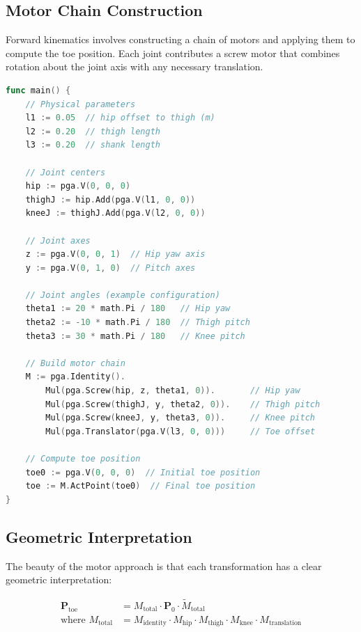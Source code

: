 \documentclass[11pt]{article}
\begin{document}
\subsection{Motor Chain Construction}

Forward kinematics involves constructing a chain of motors and applying them to compute the toe position. Each joint contributes a screw motor that combines rotation about the joint axis with any necessary translation.

\begin{lstlisting}[language=Go, caption=Forward kinematics implementation in Go]
func main() {
    // Physical parameters
    l1 := 0.05  // hip offset to thigh (m)
    l2 := 0.20  // thigh length  
    l3 := 0.20  // shank length

    // Joint centers
    hip := pga.V(0, 0, 0)
    thighJ := hip.Add(pga.V(l1, 0, 0))
    kneeJ := thighJ.Add(pga.V(l2, 0, 0))

    // Joint axes
    z := pga.V(0, 0, 1)  // Hip yaw axis
    y := pga.V(0, 1, 0)  // Pitch axes

    // Joint angles (example configuration)
    theta1 := 20 * math.Pi / 180   // Hip yaw
    theta2 := -10 * math.Pi / 180  // Thigh pitch  
    theta3 := 30 * math.Pi / 180   // Knee pitch

    // Build motor chain
    M := pga.Identity().
        Mul(pga.Screw(hip, z, theta1, 0)).       // Hip yaw
        Mul(pga.Screw(thighJ, y, theta2, 0)).    // Thigh pitch
        Mul(pga.Screw(kneeJ, y, theta3, 0)).     // Knee pitch  
        Mul(pga.Translator(pga.V(l3, 0, 0)))     // Toe offset

    // Compute toe position
    toe0 := pga.V(0, 0, 0)  // Initial toe position
    toe := M.ActPoint(toe0)  // Final toe position
}
\end{lstlisting}

\subsection{Geometric Interpretation}

The beauty of the motor approach is that each transformation has a clear geometric interpretation:

\begin{align}
\mathbf{P}_{\text{toe}} &= M_{\text{total}} \cdot \mathbf{P}_0 \cdot \tilde{M}_{\text{total}}\\
\text{where } M_{\text{total}} &= M_{\text{identity}} \cdot M_{\text{hip}} \cdot M_{\text{thigh}} \cdot M_{\text{knee}} \cdot M_{\text{translation}}
\end{align}
\end{document}
